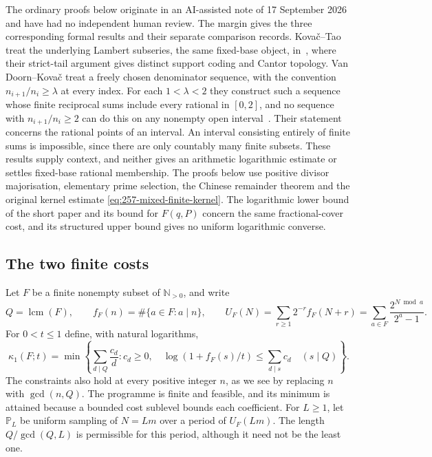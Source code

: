 The ordinary proofs below originate in an AI-assisted note of 17 September
2026 and have had no independent human review. The margin gives the three
corresponding formal results and their separate comparison records.
Kova\v{c}--Tao treat the underlying Lambert subseries, the same fixed-base
object, in~\cite[Section~2.1.2 and Remark~4.1]{kovactao}, where their strict-tail
argument gives distinct support coding and Cantor topology.
Van Doorn--Kova\v{c} treat a freely chosen denominator sequence, with the
convention $n_{i+1}/n_i\ge\lambda$ at every index.
For each $1<\lambda<2$ they construct such a sequence whose finite
reciprocal sums include every rational in $[0,2]$, and no sequence with
$n_{i+1}/n_i\ge2$ can do this on any nonempty open
interval~\cite[Theorem~1, Lemma~4 and Corollary~5]{vandoornkovac}.
Their statement concerns the rational points of an interval. An interval
consisting entirely of finite sums is impossible, since there are
only countably many finite subsets.
These results supply context, and neither gives an arithmetic logarithmic
estimate or settles fixed-base rational membership.  The proofs below use
positive divisor majorisation, elementary prime selection, the Chinese
remainder theorem and the original kernel estimate
\eqref{eq:257-mixed-finite-kernel}.  The logarithmic lower bound of the short
paper and its bound for $F(q,P)$ concern the same fractional-cover cost, and
its structured upper bound gives no uniform logarithmic converse.

\subsection{The two finite costs}
Let $F$ be a finite nonempty subset of $\mathbb N_{>0}$, and write
\[
 Q=\operatorname{lcm}(F),\qquad f_F(n)=\#\{a\in F:a\mid n\},\qquad
 U_F(N)=\sum_{r\ge1}2^{-r}f_F(N+r)
       =\sum_{a\in F}\frac{2^{N\bmod a}}{2^a-1}.
\]
For $0<t\le1$ define, with natural logarithms,
\begin{equation}
 \kappa_1(F;t)=\min\left\{\sum_{d\mid Q}\frac{c_d}{d}:
 c_d\ge0,\quad
 \log(1+f_F(s)/t)\le\sum_{d\mid s}c_d\quad(s\mid Q)\right\}.
 \label{eq:257-logarithmic-cost}
\end{equation}
The constraints also hold at every positive integer $n$, as we see by replacing $n$
with $\gcd(n,Q)$.  The programme is finite and feasible, and its minimum is
attained because a bounded cost sublevel bounds each coefficient.
For $L\ge1$, let $\mathbb P_L$ be uniform sampling of $N=Lm$ over a
period of $U_F(Lm)$. The length $Q/\gcd(Q,L)$ is permissible for this period,
although it need not be the least one.

